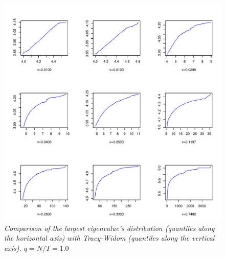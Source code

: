 \documentclass{article}
\begin{document}
\begin{figure}[htb!]
  \centering
  \includegraphics[scale=0.5]{../r/eigmax_TW_q1dot0.pdf}
  \caption{\small \it Comparison of the largest eigenvalue's
    distribution (quantiles along the horizontal axis) with
    Tracy-Widom (quantiles along the vertical axis). $q=N/T=1.0$}
  \label{fig:eig1_TW_q1.0}
\end{figure}
\end{document}
